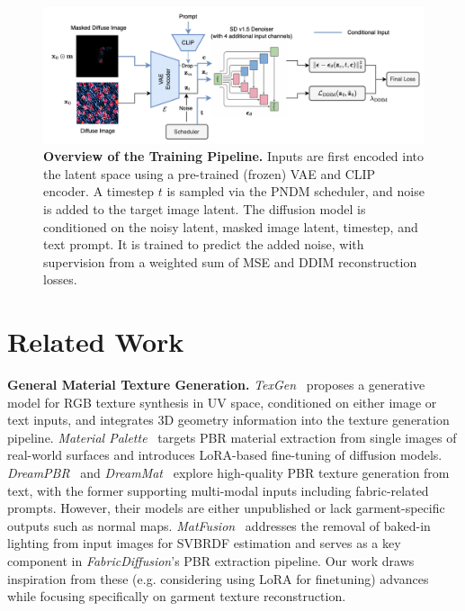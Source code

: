 \documentclass[11pt,twocolumn]{article}
\begin{document}
\begin{figure}[t]
  \centering
  \includegraphics[width=1.0\textwidth]{figures/pbr_train_overview.png}
  \vspace{0.25em}
  \caption{\textbf{Overview of the Training Pipeline.} Inputs are first encoded into the latent space using a pre-trained (frozen) VAE and CLIP encoder. 
  A timestep $t$ is sampled via the PNDM scheduler, and noise is added to the target image latent. 
  The diffusion model is conditioned on the noisy latent, masked image latent, timestep, and text prompt. 
  It is trained to predict the added noise, with supervision from a weighted sum of MSE and DDIM reconstruction losses.}
  \label{fig:trn-overview}
\end{figure}
\section{Related Work}

\textbf{General Material Texture Generation.} \textit{TexGen}~\cite{texgen} proposes a generative model for RGB texture synthesis in UV space, 
conditioned on either image or text inputs, and integrates 3D geometry information into the texture generation pipeline. 
\textit{Material Palette}~\cite{materialpalette} targets PBR material extraction from single images of 
real-world surfaces and introduces LoRA-based fine-tuning of diffusion models. 
\textit{DreamPBR}~\cite{dreampbr} and \textit{DreamMat}~\cite{dreammat} explore high-quality PBR texture generation from text, with the 
former supporting multi-modal inputs including fabric-related prompts. 
However, their models are either unpublished or lack garment-specific outputs such as normal maps. 
\textit{MatFusion}~\cite{matfusion} addresses the removal of baked-in lighting from input images for SVBRDF 
estimation and serves as a key component in \textit{FabricDiffusion}'s PBR extraction pipeline. Our work draws 
inspiration from these (e.g. considering using LoRA for finetuning) advances while focusing specifically on garment texture reconstruction.
\end{document}
